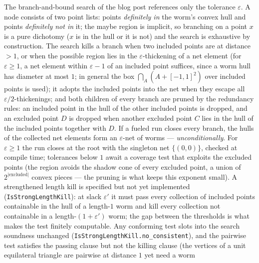 \begin{theorem}
    \label{thm:bnbSearch}
    \leanok
    The branch-and-bound search of the blog post references only the
    tolerance $\varepsilon$. A node consists of two point lists: points
    \emph{definitely in} the worm's convex hull and points \emph{definitely
    not in} it; the maybe region is implicit, so branching on a point $x$ is
    a pure dichotomy ($x$ is in the hull or it is not) and the search is
    exhaustive by construction. The search kills a branch when two included
    points are at distance $> 1$, or when the possible region lies in the
    $\varepsilon$-thickening of a net element (for $\varepsilon \ge 1$, a
    net element within $\varepsilon - 1$ of an included point suffices,
    since a worm hull has diameter at most $1$; in general the box
    $\bigcap_A (A + [-1,1]^2)$ over included points is used); it adopts the
    included points into the net when they escape all
    $\varepsilon/2$-thickenings; and both children of every branch are
    pruned by the redundancy rules: an included point in the hull of the
    other included points is dropped, and an excluded point $D$ is dropped
    when another excluded point $C$ lies in the hull of the included points
    together with $D$. If a fueled run closes every branch, the hulls of the
    collected net elements form an $\varepsilon$-net of worms —
    \emph{unconditionally}. For $\varepsilon \ge 1$ the run closes at the
    root with the singleton net $\{(0,0)\}$, checked at compile time;
    tolerances below $1$ await a coverage test that exploits the excluded
    points (the region avoids the shadow cone of every excluded point, a
    union of $2^{|\mathrm{excluded}|}$ convex pieces — the pruning is what
    keeps this exponent small). A strengthened length kill is specified but
    not yet implemented (\texttt{IsStrongLengthKill}): at slack
    $\varepsilon'$ it must pass every collection of included points
    containable in the hull of a length-$1$ worm and kill every collection
    not containable in a length-$(1+\varepsilon')$ worm; the gap between
    the thresholds is what makes the test finitely computable. Any
    conforming test slots into the search soundness unchanged
    (\texttt{IsStrongLengthKill.no\_consistent}), and the pairwise test
    satisfies the passing clause but not the killing clause (the vertices of
    a unit equilateral triangle are pairwise at distance $1$ yet need a worm

\end{theorem}
